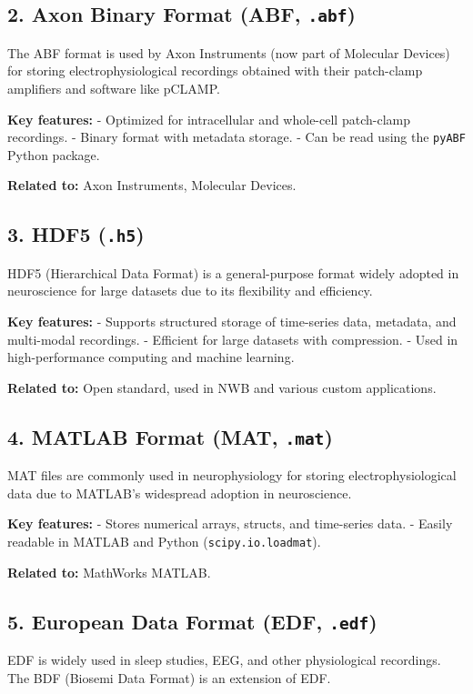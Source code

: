 \documentclass[a4paper,9pt]{extarticle}
\begin{document}
\begin{multicols}{2}
\subsection*{2. Axon Binary Format (ABF, \texttt{.abf})}
The ABF format is used by Axon Instruments (now part of Molecular Devices) for storing electrophysiological recordings obtained with their patch-clamp amplifiers and software like pCLAMP.

\textbf{Key features:}  
- Optimized for intracellular and whole-cell patch-clamp recordings.  
- Binary format with metadata storage.  
- Can be read using the \texttt{pyABF} Python package.

\textbf{Related to:} Axon Instruments, Molecular Devices.

\subsection*{3. HDF5 (\texttt{.h5})}
HDF5 (Hierarchical Data Format) is a general-purpose format widely adopted in neuroscience for large datasets due to its flexibility and efficiency.

\textbf{Key features:}  
- Supports structured storage of time-series data, metadata, and multi-modal recordings.  
- Efficient for large datasets with compression.  
- Used in high-performance computing and machine learning.

\textbf{Related to:} Open standard, used in NWB and various custom applications.

\subsection*{4. MATLAB Format (MAT, \texttt{.mat})}
MAT files are commonly used in neurophysiology for storing electrophysiological data due to MATLAB's widespread adoption in neuroscience.

\textbf{Key features:}  
- Stores numerical arrays, structs, and time-series data.  
- Easily readable in MATLAB and Python (\texttt{scipy.io.loadmat}).  

\textbf{Related to:} MathWorks MATLAB.

\subsection*{5. European Data Format (EDF, \texttt{.edf})}
EDF is widely used in sleep studies, EEG, and other physiological recordings. The BDF (Biosemi Data Format) is an extension of EDF.


\end{multicols}
\end{document}
